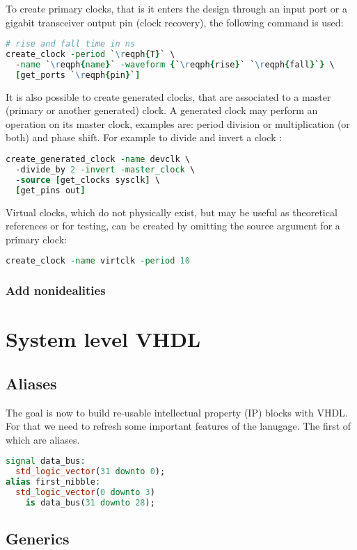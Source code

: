 \documentclass[margin=small]{tex/hsrzf}
\begin{document}
To create primary clocks, that is it enters the design through an input port or a gigabit transceiver output pin (clock recovery), the following command is used:
\begin{lstlisting}[language = tcl]
# rise and fall time in ns
create_clock -period `\reqph{T}` \
  -name `\reqph{name}` -waveform {`\reqph{rise}` `\reqph{fall}`} \
  [get_ports `\reqph{pin}`]
\end{lstlisting}
It is also possible to create generated clocks, that are associated to a master (primary or another generated) clock. A generated clock may perform an operation on its master clock, examples are: period division or multiplication (or both) and phase shift. For example to divide and invert a clock :
\begin{lstlisting}[language = tcl]
create_generated_clock -name devclk \
  -divide_by 2 -invert -master_clock \
  -source [get_clocks sysclk] \
  [get_pins out]
\end{lstlisting}
Virtual clocks, which do not physically exist, but may be useful as theoretical references or for testing, can be created by omitting the source argument for a primary clock:
\begin{lstlisting}[language = tcl]
create_clock -name virtclk -period 10
\end{lstlisting}

\subsubsection{Add nonidealities}

\section{System level VHDL}

\subsection{Aliases}
The goal is now to build re-usable intellectual property (IP) blocks with VHDL. For that we need to refresh some important features of the lanugage. The first of which are aliases.
\begin{lstlisting}[language=vhdl]
signal data_bus:
  std_logic_vector(31 downto 0);
alias first_nibble:
  std_logic_vector(0 downto 3)
    is data_bus(31 downto 28);
\end{lstlisting}

\subsection{Generics}
\end{document}
